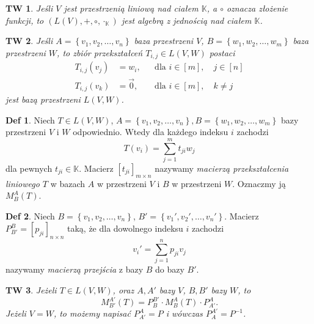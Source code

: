 \documentclass[a4paper, 12pt]{mwart}
\theoremstyle{definition}
\newtheorem{definicja}{Def}[section]
\theoremstyle{plain}
\newtheorem{twierdzenie}{TW}[section]
\theoremstyle{remark}
\begin{document}
\begin{twierdzenie}
	Jeśli $V$ jest przestrzenią liniową nad ciałem $\mathbb{K}$, a $\circ$ oznacza złożenie funkcji, to $\left(L(V), +, \circ, \cdot_\mathbb{K}\right)$ jest algebrą z jednością nad ciałem $\mathbb{K}$.
\end{twierdzenie}
\begin{twierdzenie}
	Jeśli $A = \left\{v_1, v_2, \ldots, v_n\right\}$ \ppauza baza przestrzeni $V$, $B = \left\{w_1, w_2, \ldots, w_m\right\}$ \ppauza baza przestrzeni $W$, to zbiór przekształceń $T_{i,j} \in L(V, W)$ postaci
	\begin{align}
		T_{i,j}(v_j) &= w_i, &&\text{dla } i \in [m], \quad j \in [n] \\
		T_{i,j}(v_k) &= \vec{0}, &&\text{dla } i \in [m], \quad k \neq j
	\end{align}
	jest bazą przestrzeni $L(V, W)$.
\end{twierdzenie}
\begin{definicja}
	Niech $T \in L(V, W)$, $A = \left\{v_1, v_2, \ldots, v_n\right\}, B = \left\{w_1, w_2, \ldots, w_m\right\}$ \ppauza bazy przestrzeni $V$ i $W$ odpowiednio. Wtedy dla każdego indeksu $i$ zachodzi
	\begin{equation}
		T(v_i) = \sum_{j = 1}^m t_{ji}w_j
	\end{equation}
	dla pewnych $t_{ji} \in \mathbb{K}$. Macierz $\left[t_{ji}\right]_{m \times n}$ nazywamy \emph{macierzą przekształcenia liniowego $T$} w bazach $A$ w przestrzeni $V$ i $B$ w przestrzeni $W$. Oznaczmy ją $M_B^A(T)$.
\end{definicja}
\begin{definicja}
	Niech $B = \left\{v_1, v_2, \ldots, v_n \right\}$, $B' = \left\{v_1', v_2', \ldots, v_n' \right\}$. Macierz $P^B_{B'} = [p_{ji}]_{n \times n}$ taką, że dla dowolnego indeksu $i$ zachodzi
	\begin{equation}
		v_i' = \sum_{j = 1}^n p_{ji}v_j
	\end{equation}
	nazywamy \emph{macierzą przejścia} z bazy $B$ do bazy $B'$.
\end{definicja}
\begin{twierdzenie}
	Jeżeli $T \in L(V, W)$, oraz $A, A'$ \ppauza bazy $V$, $B, B'$ \ppauza bazy $W$, to
	\begin{equation}
		 M^{A'}_{B'}(T) = P^{B'}_B \cdot M^A_B(T) \cdot P^A_{A'}.
	\end{equation}
	Jeżeli $V = W$, to możemy napisać $P^A_{A'} = P$ i wówczas $P^{A'}_A = P^{-1}$.
\end{twierdzenie}
\end{document}
